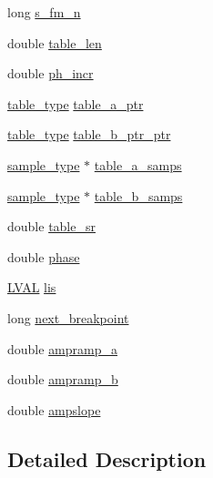 \begin{DoxyCompactItemize}
\item 
long \hyperlink{structsiosc__susp__struct_acd630390822c58af2bf396c2da8811d4}{s\+\_\+fm\+\_\+n}
\item 
double \hyperlink{structsiosc__susp__struct_a26dc911eb3bea05ecd121e212b91ba23}{table\+\_\+len}
\item 
double \hyperlink{structsiosc__susp__struct_a66b08fed7f1ccce476dd97000eb1fcd0}{ph\+\_\+incr}
\item 
\hyperlink{sound_8h_a187b856587310160cfd8b383e7377171}{table\+\_\+type} \hyperlink{structsiosc__susp__struct_ac80d8496c1aa029b810fbbf3188a4bfe}{table\+\_\+a\+\_\+ptr}
\item 
\hyperlink{sound_8h_a187b856587310160cfd8b383e7377171}{table\+\_\+type} \hyperlink{structsiosc__susp__struct_a65604f925d0d3ab93b8c740277e20ab1}{table\+\_\+b\+\_\+ptr\+\_\+ptr}
\item 
\hyperlink{sound_8h_a3a9d1d4a1c153390d2401a6e9f71b32c}{sample\+\_\+type} $\ast$ \hyperlink{structsiosc__susp__struct_afdfd7ce5e832efc4ff2f4c957b5a78ed}{table\+\_\+a\+\_\+samps}
\item 
\hyperlink{sound_8h_a3a9d1d4a1c153390d2401a6e9f71b32c}{sample\+\_\+type} $\ast$ \hyperlink{structsiosc__susp__struct_a15a851e0715230335485916e97e76c6e}{table\+\_\+b\+\_\+samps}
\item 
double \hyperlink{structsiosc__susp__struct_a70e2bd293641d2c36564b247856e9f6e}{table\+\_\+sr}
\item 
double \hyperlink{structsiosc__susp__struct_a225ea78527ce0ef59a41601e6f7648c4}{phase}
\item 
\hyperlink{xldmem_8h_a9a9ec6a5fbca2b40ed8d19faa799be8c}{L\+V\+AL} \hyperlink{structsiosc__susp__struct_aaeff61265944ecbb1f84bab30dd07205}{lis}
\item 
long \hyperlink{structsiosc__susp__struct_a50dab83c56dacaec5348d126ac36f1a0}{next\+\_\+breakpoint}
\item 
double \hyperlink{structsiosc__susp__struct_ad733bac01c315e5afc93ffc4bef0e41c}{ampramp\+\_\+a}
\item 
double \hyperlink{structsiosc__susp__struct_a7378d3d08c8d3f50bd099a722d607329}{ampramp\+\_\+b}
\item 
double \hyperlink{structsiosc__susp__struct_a5ac09cbe99fbd384e40907b319b7bd51}{ampslope}
\end{DoxyCompactItemize}


\subsection{Detailed Description}


